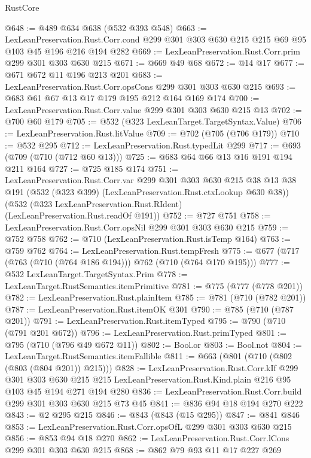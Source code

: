 \begin{lexlean}{RustCore}
\begin{coremodule}
@648 := @489 @634 @638 (@532 @393 @548)
@663 := LexLeanPreservation.Rust.Corr.cond
    @299
    @301
    @303
    @630
    @215
    @215
    @69
    @95
    @103
    @45
    @196
    @216
    @194
    @282
@669 := LexLeanPreservation.Rust.Corr.prim @299 @301 @303 @630 @215
@671 := @669 @49 @68
@672 := @14 @17
@677 := @671 @672 @11 @196 @213 @201
@683 := LexLeanPreservation.Rust.Corr.opsCons @299 @301 @303 @630 @215
@693 := @683 @61 @67 @13 @17 @179 @195 @212 @164 @169 @174
@700 := LexLeanPreservation.Rust.Corr.value @299 @301 @303 @630 @215 @13
@702 := @700 @60 @179
@705 := @532 (@323 LexLeanTarget.TargetSyntax.Value)
@706 := LexLeanPreservation.Rust.litValue
@709 := @702 (@705 (@706 @179))
@710 := @532 @295
@712 := LexLeanPreservation.Rust.typedLit @299
@717 := @693 (@709 (@710 (@712 @60 @13)))
@725 := @683 @64 @66 @13 @16 @191 @194 @211 @164
@727 := @725 @185 @174
@751 := LexLeanPreservation.Rust.Corr.var
    @299
    @301
    @303
    @630
    @215
    @38
    @13
    @38
    @191
    (@532 (@323 @399) (LexLeanPreservation.Rust.ctxLookup @630 @38))
    (@532 (@323 LexLeanPreservation.Rust.RIdent) (LexLeanPreservation.Rust.readOf @191))
@752 := @727 @751
@758 := LexLeanPreservation.Rust.Corr.opsNil @299 @301 @303 @630 @215
@759 := @752 @758
@762 := @710 (LexLeanPreservation.Rust.isTemp @164)
@763 := @759 @762
@764 := LexLeanPreservation.Rust.tempFresh
@775 := @677 (@717 (@763 (@710 (@764 @186 @194))) @762 (@710 (@764 @170 @195)))
@777 := @532 LexLeanTarget.TargetSyntax.Prim
@778 := LexLeanTarget.RustSemantics.itemPrimitive
@781 := @775 (@777 (@778 @201))
@782 := LexLeanPreservation.Rust.plainItem
@785 := @781 (@710 (@782 @201))
@787 := LexLeanPreservation.Rust.itemOK @301
@790 := @785 (@710 (@787 @201))
@791 := LexLeanPreservation.Rust.itemTyped
@795 := @790 (@710 (@791 @201 @672))
@796 := LexLeanPreservation.Rust.primTyped
@801 := @795 (@710 (@796 @49 @672 @11))
@802 := Bool.or
@803 := Bool.not
@804 := LexLeanTarget.RustSemantics.itemFallible
@811 := @663 (@801 (@710 (@802 (@803 (@804 @201)) @215)))
@828 := LexLeanPreservation.Rust.Corr.kIf
    @299
    @301
    @303
    @630
    @215
    @215
    LexLeanPreservation.Rust.Kind.plain
    @216
    @95
    @103
    @45
    @194
    @271
    @194
    @280
@836 := LexLeanPreservation.Rust.Corr.build @299 @301 @303 @630 @215 @73 @45
@841 := @836 @94 @18 @194 @270 @222
@843 := @2 @295 @215
@846 := @843 (@843 (@15 @295))
@847 := @841 @846
@853 := LexLeanPreservation.Rust.Corr.opsOfL @299 @301 @303 @630 @215
@856 := @853 @94 @18 @270
@862 := LexLeanPreservation.Rust.Corr.lCons @299 @301 @303 @630 @215
@868 := @862 @79 @93 @11 @17 @227 @269

\end{coremodule}
\end{lexlean}

